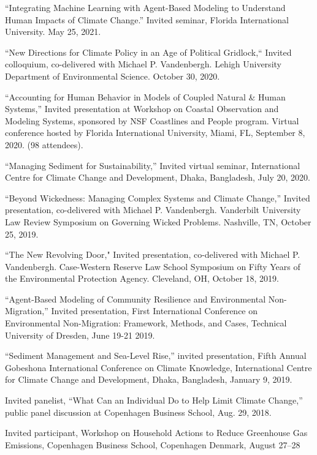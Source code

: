 %
%
\item ``Integrating Machine Learning with Agent-Based Modeling to Understand
  Human Impacts of Climate Change.'' Invited seminar, Florida International
  University. May 25, 2021.
\item ``New Directions for Climate Policy in an Age of Political Gridlock,``
  Invited colloquium, co-delivered with Michael P. Vandenbergh. Lehigh
  University Department of Environmental Science. October 30, 2020.
\item ``Accounting for Human Behavior in Models of Coupled Natural \& Human
  Systems,'' Invited presentation at Workshop on Coastal Observation and
  Modeling Systems, sponsored by NSF Coastlines and People program. Virtual
  conference hosted by Florida International University, Miami, FL,
  September 8, 2020. (98 attendees).
\item ``Managing Sediment for Sustainability,'' Invited virtual seminar,
  International Centre for Climate Change and Development, Dhaka, Bangladesh,
  July 20, 2020.
\item ``Beyond Wickedness: Managing Complex Systems and Climate Change,''
  Invited presentation, co-delivered with Michael P. Vandenbergh. Vanderbilt
  University Law Review Symposium on Governing Wicked Problems. Nashville, TN,
  October 25, 2019.
\item ``The New Revolving Door," Invited presentation, co-delivered with
  Michael P. Vandenbergh. Case-Western Reserve Law School Symposium on Fifty
  Years of the Environmental Protection Agency. Cleveland, OH, October 18, 2019.
\item ``Agent-Based Modeling of Community Resilience and Environmental
 Non-Migration,'' Invited presentation, First International Conference on
 Environmental Non-Migration: Framework, Methods, and Cases, Technical
 University of Dresden, June 19-21 2019.
\item ``Sediment Management and Sea-Level Rise,'' invited presentation, Fifth
  Annual Gobeshona International Conference on Climate Knowledge, International
  Centre for Climate Change and Development, Dhaka, Bangladesh, January 9, 2019.
\item Invited panelist, ``What Can an Individual Do to Help Limit Climate
  Change,'' public panel discussion at Copenhagen Business School, Aug. 29,
  2018.
\item Invited participant, Workshop on Household Actions to Reduce Greenhouse
  Gas Emissions, Copenhagen Business School, Copenhagen Denmark, August 27--28
